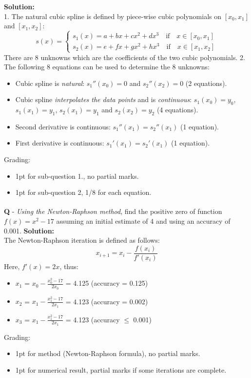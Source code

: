 \documentclass{llncs}
\newcounter{ques}
\renewcommand{\question}[1]{\paragraph{}\textbf{Q\theques} - #1\stepcounter{ques} }
\newcommand{\answer}[1]{\color{red}\textbf{Solution:}\\#1\color{black}}
\begin{document}
\answer{
1. The natural cubic spline is defined by piece-wise cubic polynomials on $[x_0, x_1]$ and $[x_1, x_2]$:
$$
s(x)=\begin{cases}
s_1(x) = a + bx + cx^2 + dx^3 \quad \mathrm{if} \quad x \in [x_0, x_1] \\
s_2(x) = e + fx + gx^2 + hx^3 \quad \mathrm{if} \quad x \in [x_1, x_2]
\end{cases}
$$
There are 8 unknowns which are the coefficients of the two cubic polynomials.
2. The following 8 equations can be used to determine the 8 unknowns:
\begin{itemize}
\item Cubic spline is \emph{natural}: $s_1''(x_0) = 0$ and $s_2''(x_2)=0$ (2 equations).
\item Cubic spline \emph{interpolates the data points} and is \emph{continuous}: $s_1(x_0)=y_0$, $s_1(x_1)=y_1$, $s_2(x_1)=y_1$ and $s_2(x_2)=y_2$ (4 equations).
\item Second derivative is continuous: $s_1''(x_1)=s_2''(x_1)$ (1 equation).
\item First derivative is continuous: $s_1'(x_1)=s_2'(x_1)$ (1 equation).
\end{itemize}
Grading:
\begin{itemize}
\item 1pt for sub-question 1., no partial marks.
\item 1pt for sub-question 2, 1/8 for each equation.
\end{itemize}
}

\newpage
\question{\emph{Using the Newton-Raphson method}, find the positive zero of function $f(x)=x^2-17$ assuming an initial estimate
of 4 and using an accuracy of 0.001.}
\answer{
The Newton-Raphson iteration is defined as follows:
$$
x_{i+1} = x_i - \frac{f(x_{i})}{f'(x_{i})}
$$
Here, $f'(x)=2x$, thus:
\begin{itemize}
\item $x_1$ = $x_0 - \frac{x_0^2-17}{2x_0}$ = 4.125 (accuracy = 0.125)
\item $x_2$ = $x_1 - \frac{x_1^2-17}{2x_1}$ = 4.123 (accuracy = 0.002)
\item $x_3$ = $x_1 - \frac{x_1^2-17}{2x_1}$ = 4.123 (accuracy $\leq$ 0.001)
\end{itemize}
Grading:
\begin{itemize}
\item 1pt for method (Newton-Raphson formula), no partial marks.
\item 1pt for numerical result, partial marks if some iterations are complete.
\end{itemize}
}
\end{document}
